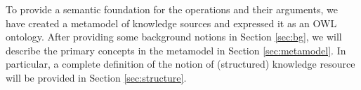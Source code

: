 \documentclass[runningheads]{llncs}
\begin{document}
To provide a semantic foundation for the operations and their arguments, we have created a metamodel of knowledge sources and expressed it as an OWL ontology.
After providing some background notions in Section \ref{sec:bg}, we will describe the primary concepts in the metamodel in Section \ref{sec:metamodel}. In particular, a complete definition of the notion of (structured) knowledge resource will be provided in Section \ref{sec:structure}. 



\end{document}
